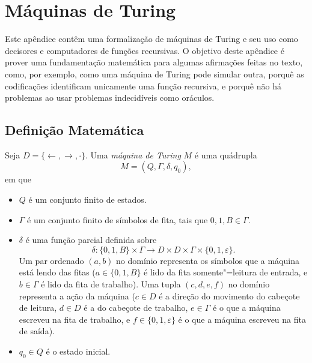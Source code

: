 \chapter{Máquinas de Turing}
\label{app:turing_machines}

Este apêndice contêm uma formalização de máquinas de Turing
e seu uso como decisores e computadores de funções recursivas.
O objetivo deste apêndice é prover uma fundamentação matemática
para algumas afirmações feitas no texto,
como, por exemplo,
como uma máquina de Turing pode simular outra,
porquê as codificações identificam unicamente uma função recursiva,
e porquê não há problemas ao usar problemas indecidíveis como oráculos.

\section{Definição Matemática}

\begin{definition}
    Seja $D = \{\leftarrow, \rightarrow, \cdot\}$.
    Uma \emph{máquina de Turing} $M$ é uma quádrupla
    \begin{equation*}
        M = (Q, \Gamma, \delta, q_0),
    \end{equation*}
    em que
    \begin{itemize}
        \item $Q$ é um conjunto finito de estados.
        \item $\Gamma$ é um conjunto finito de símbolos de fita,
            tais que $0, 1, B \in \Gamma$.
        \item $\delta$ é uma função parcial definida sobre
            \begin{equation*}
                \delta: \{0, 1, B\} \times \Gamma
                    \to D \times D \times \Gamma \times \{0, 1, \varepsilon\}.
            \end{equation*}
            Um par ordenado $(a, b)$ no domínio
            representa os símbolos que a máquina está lendo das fitas
            ($a \in \{0, 1, B\}$ é lido da fita somente"=leitura de entrada,
            e $b \in \Gamma$ é lido da fita de trabalho).
            Uma tupla $(c, d, e, f)$ no domínio
            representa a ação da máquina
            ($c \in D$ é a direção do movimento do cabeçote de leitura,
            $d \in D$ é a do cabeçote de trabalho,
            $e \in \Gamma$ é o que a máquina escreveu na fita de trabalho,
            e $f \in \{0, 1, \varepsilon\}$ é o que a máquina escreveu
            na fita de saída).
        \item $q_0 \in Q$ é o estado inicial.
    \end{itemize}
\end{definition}

